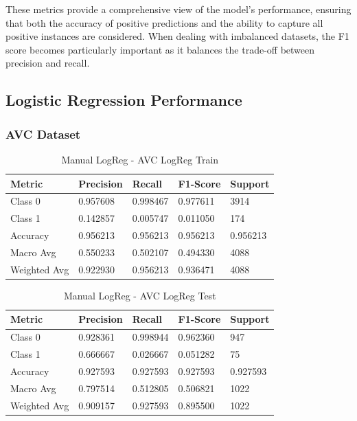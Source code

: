 \documentclass[a4paper,12pt]{article}
\begin{document}
These metrics provide a comprehensive view of the model's performance, ensuring that both the accuracy of positive predictions and the ability to capture all positive instances are considered. When dealing with imbalanced datasets, the F1 score becomes particularly important as it balances the trade-off between precision and recall.

\subsection{Logistic Regression Performance}

\subsubsection{AVC Dataset}

\begin{table}[h!]
    \centering
    \caption{Manual LogReg - AVC LogReg Train}
    \begin{tabularx}{\textwidth}{|l|X|X|X|X|}
    \hline
    \textbf{Metric} & \textbf{Precision} & \textbf{Recall} & \textbf{F1-Score} & \textbf{Support} \\
    \hline
    Class 0 & 0.957608 & 0.998467 & 0.977611 & 3914 \\
    Class 1 & 0.142857 & 0.005747 & 0.011050 & 174 \\
    Accuracy & 0.956213 & 0.956213 & 0.956213 & 0.956213 \\
    Macro Avg & 0.550233 & 0.502107 & 0.494330 & 4088 \\
    Weighted Avg & 0.922930 & 0.956213 & 0.936471 & 4088 \\
    \hline
    \end{tabularx}
    \end{table}
    
    \begin{table}[h!]
    \centering
    \caption{Manual LogReg - AVC LogReg Test}
    \begin{tabularx}{\textwidth}{|l|X|X|X|X|}
    \hline
    \textbf{Metric} & \textbf{Precision} & \textbf{Recall} & \textbf{F1-Score} & \textbf{Support} \\
    \hline
    Class 0 & 0.928361 & 0.998944 & 0.962360 & 947 \\
    Class 1 & 0.666667 & 0.026667 & 0.051282 & 75 \\
    Accuracy & 0.927593 & 0.927593 & 0.927593 & 0.927593 \\
    Macro Avg & 0.797514 & 0.512805 & 0.506821 & 1022 \\
    Weighted Avg & 0.909157 & 0.927593 & 0.895500 & 1022 \\
    \hline
    \end{tabularx}
    \end{table}
    
\end{document}

